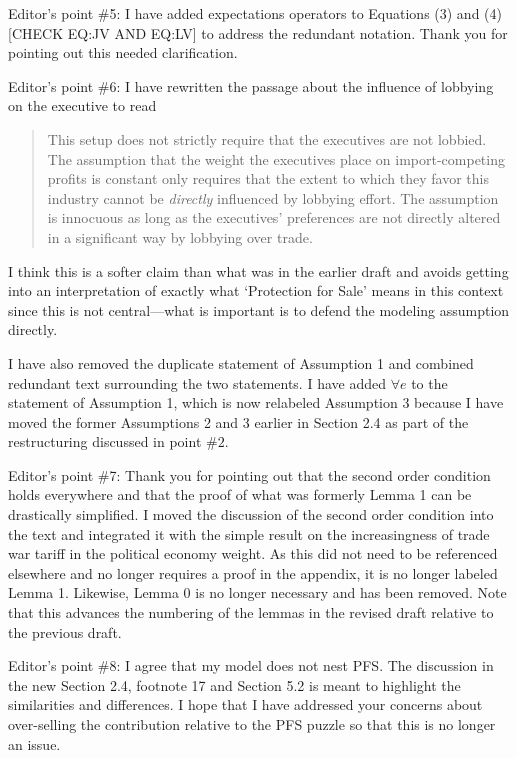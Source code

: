 \documentclass[12pt]{article}
\begin{document}
Editor's point $\#$5: I have added expectations operators to Equations (3) and (4) [{\color{blue}CHECK EQ:JV AND EQ:LV}] to address the redundant notation. Thank you for pointing out this needed clarification.

Editor's point $\#$6: I have rewritten the passage about the influence of lobbying on the executive to read
\begin{quote}
  This setup does not strictly require that the executives are not lobbied. The assumption that the weight the executives place on import-competing profits is constant only requires that the extent to which they favor this industry cannot be \textit{directly} influenced by lobbying effort. The assumption is innocuous as long as the executives' preferences are not directly altered in a significant way by lobbying over trade.
\end{quote}
I think this is a softer claim than what was in the earlier draft and avoids getting into an interpretation of exactly what `Protection for Sale' means in this context since this is not central---what is important is to defend the modeling assumption directly.

I have also removed the duplicate statement of Assumption 1 and combined redundant text surrounding the two statements. I have added $\forall e$ to the statement of Assumption 1, which is now relabeled Assumption 3 because I have moved the former Assumptions 2 and 3 earlier in Section 2.4 as part of the restructuring discussed in point $\#2$.

Editor's point $\#$7: Thank you for pointing out that the second order condition holds everywhere and that the proof of what was formerly Lemma 1 can be drastically simplified. I moved the discussion of the second order condition into the text and integrated it with the simple result on the increasingness of trade war tariff in the political economy weight. As this did not need to be referenced elsewhere and no longer requires a proof in the appendix, it is no longer labeled Lemma 1. Likewise, Lemma 0 is no longer necessary and has been removed. Note that this advances the numbering of the lemmas in the revised draft relative to the previous draft. 

Editor's point $\#8$: I agree that my model does not nest PFS. The discussion in the new Section 2.4, footnote 17 and Section 5.2 is meant to highlight the similarities and differences. I hope that I have addressed your concerns about over-selling the contribution relative to the PFS puzzle so that this is no longer an issue.
\end{document}
